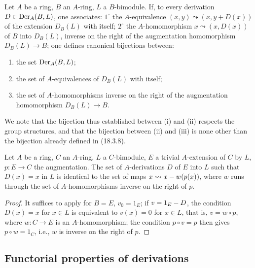 \begin{corollary}[20.1.6]
\label{0.20.1.6}
Let $A$ be a ring, $B$ an $A$-ring, $L$ a $B$-bimodule.
If, to every derivation $D\in\operatorname{Der}_A(B,L)$, one associates: $1^\circ$ the $A$-equivalence $(x,y)\leadsto(x,y+D(x))$ of the extension $D_B(L)$ with itself; $2^\circ$ the $A$-homomorphism $x\leadsto(x,D(x))$ of $B$ into $D_B(L)$, inverse on the right of the augmentation homomorphism $D_B(L)\to B$; one defines canonical bijections between:
\begin{enumerate}
  \item[\rm(i)] the set $\operatorname{Der}_A(B,L)$;
  \item[\rm(ii)] the set of $A$-equivalences of $D_B(L)$ with itself;
  \item[\rm(iii)] the set of $A$-homomorphisms inverse on the right of the augmentation homomorphism $D_B(L)\to B$.
\end{enumerate}
\end{corollary}

We note that the bijection thus established between (i) and (ii) respects the group structures, and that the bijection between (ii) and (iii) is none other than the bijection already defined in (18.3.8).

\begin{corollary}[20.1.7]
\label{0.20.1.7}
Let $A$ be a ring, $C$ an $A$-ring, $L$ a $C$-bimodule, $E$ a trivial $A$-extension of $C$ by $L$, $p:E\to C$ the augmentation.
The set of $A$-derivations $D$ of $E$ into $L$ such that $D(x)=x$ in $L$ is identical to the set of maps $x\leadsto x- w(p(x))$, where $w$ runs through the set of $A$-homomorphisms inverse on the right of $p$.
\end{corollary}

\begin{proof}
It suffices to apply  for $B=E$, $v_0=1_E$; if $v=1_E- D$, the condition $D(x)=x$ for $x\in L$ is equivalent to $v(x)=0$ for $x\in L$, that is, $v=w\circ p$, where $w:C\to E$ is an $A$-homomorphism; the condition $p\circ v=p$ then gives $p\circ w=1_C$, i.e., $w$ is inverse on the right of $p$.
\end{proof}

\subsection{Functorial properties of derivations}
\label{subsection:0.20.2}

